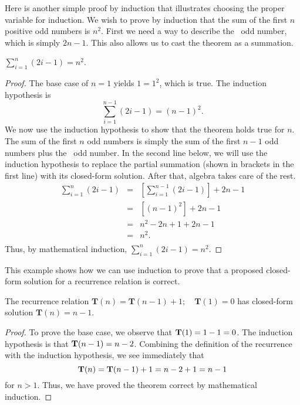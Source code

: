 \begin{example}
\label{nOdds}
Here is another simple proof by induction that illustrates
choosing the proper variable for induction.
We wish to prove by induction that the sum of the first \(n\) positive
odd numbers is \(n^2\).
First we need a way to describe the \nth\ odd number, which is
simply \(2n - 1\).
This also allows us to cast the theorem as a summation.
\medskip

\begin{theorem}
\(\sum_{i=1}^n (2i - 1) = n^2\).
\end{theorem}

\begin{proof}
The base case of \(n = 1\) yields \(1 = 1^2\), which is true.
The induction hypothesis is
\[ \sum_{i=1}^{n-1} (2i - 1) = (n-1)^2.\]
We now use the induction hypothesis to show that the theorem
holds true for \(n\).
The sum of the first \(n\) odd numbers is simply the sum of the first
\(n-1\) odd numbers plus the \nth\ odd number.
In the second line below, we will use the induction hypothesis to
replace the partial summation (shown in brackets in the first line)
with its closed-form solution.
After that, algebra takes care of the rest.
\begin{eqnarray*}
\sum_{i=1}^n (2i - 1) &=& \left[ \sum_{i=1}^{n-1} (2i - 1) \right] + 2n - 1\\
  &=& [(n-1)^2] + 2n - 1\\
  &=& n^2 - 2n + 1 + 2n - 1\\
  &=& n^2.\\
\end{eqnarray*}
\noindent Thus, by mathematical induction,
\( \sum_{i=1}^n (2i - 1) = n^2\).
\end{proof}
\end{example}

\begin{example}
\label{FactRecurProof}
This example shows how we can use induction to prove that a proposed
closed-form solution for a recurrence relation is correct.
\medskip

\begin{theorem}
The recurrence relation
\(\mathbf{T}(n) = \mathbf{T}(n-1) + 1; \quad \mathbf{T}(1) = 0\)
has closed-form solution \(\mathbf{T}(n) = n-1\).
\end{theorem}

\begin{proof}
To prove the base case, we observe that \({\textbf{T}}(1) = 1-1 = 0\).
The induction hypothesis is that \(\mbox{$\textbf{T}(n-1)$} = n-2\).
Combining the definition of the recurrence with the induction
hypothesis, we see immediately that
\[\mbox{$\textbf{T}(n)$} = \mbox{$\textbf{T}(n-1)$} + 1 = n-2 + 1 = n-1\]
for \(n > 1\).
Thus, we have proved the theorem correct by mathematical induction.
\end{proof}
\end{example}

